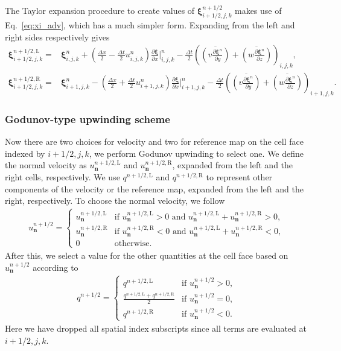 \documentclass[times, 10pt]{article}
\renewcommand{\vec}[1]{\mathbf{#1}}
\newcommand{\p}{\partial}
\newcommand{\nor}{\vec{n}}
\newcommand{\vxi}{\boldsymbol\xi}
\begin{document}
The Taylor expansion procedure to create values of $\vxi^{n+1/2}_{i+1/2, j, k}$ makes use of Eq.~\eqref{eq:xi_adv}, which has a much simpler form. Expanding from the left and right sides respectively gives
\begin{align}
\vxi^{n+1/2,\text{L}}_{i+1/2,j,k} =& \vxi^{n}_{i,j,k} + \left( \frac{\Delta x}{2} - \frac{\Delta t}{2} u^n_{i,j,k} \right) \frac{\p \vxi}{\p x} \bigg |^n_{i,j,k}
- \frac{\Delta t}{2} \left (\overline{\left(v\frac{\p \vxi^n}{\p y}\right)} + \overline{\left(w\frac{\p \vxi^n}{\p z}\right)} \right )_{i,j,k},  \\
%
\vxi^{n+1/2,\text{R}}_{i+1/2,j,k} =& \vxi^{n}_{i+1,j,k} - \left( \frac{\Delta x}{2} + \frac{\Delta t}{2} u^n_{i+1,j,k} \right) \frac{\p \vxi}{\p x} \bigg |^n_{i+1,j,k}
- \frac{\Delta t}{2} \left (\overline{\left(v\frac{\p \vxi^n}{\p y}\right)} + \overline{\left(w\frac{\p \vxi^n}{\p z}\right)} \right )_{i+1,j,k}.
\label{eq:xi_taylor_final}
\end{align}

\subsubsection*{Godunov-type upwinding scheme}
\label{sub:godunov}
Now there are two choices for velocity and two for reference map on the cell face indexed by ${i+1/2,j,k}$, we perform Godunov upwinding to select one.
We define the normal velocity as $u_{\nor}^{n+1/2, \text{L}}$ and $u_{\nor}^{n+1/2, \text{R}}$, expanded from the left and the right cells, respectively.
We use $q^{n+1/2, \text{L}}$ and $q^{n+1/2, \text{R}}$ to represent other components of the velocity or the reference map, expanded from the left and the right, respectively.
To choose the normal velocity, we follow
\begin{align}
u_{\nor}^{n+1/2} =
\begin{cases}
u_{\nor}^{n+1/2, \text{L}} & \text{if~} u_{\nor}^{n+1/2, \text{L}}  > 0 \text{~and~} u_{\nor}^{n+1/2, \text{L}}  + u_{\nor}^{n+1/2, \text{R}}  > 0, \\
u_{\nor}^{n+1/2, \text{R}} & \text{if~} u_{\nor}^{n+1/2, \text{R}} < 0 \text{~and~} u_{\nor}^{n+1/2, \text{L}}  + u_{\nor}^{n+1/2, \text{R}}  < 0, \\
0  & \text{otherwise.}
\end{cases}
\end{align}
After this, we select a value for the other quantities at the cell face based on $u_{\nor}^{n+1/2}$ according to
\begin{align}
q^{n+1/2} =
\begin{cases}
q^{n+1/2, \text{L}} & \text{if~} u_{\nor}^{n+1/2}  > 0, \\
\frac{q^{n+1/2, \text{L}}  + q^{n+1/2, \text{R}} }{2}  & \text{if~} u_{\nor}^{n+1/2} = 0, \\
q^{n+1/2, \text{R}} & \text{if~} u_{\nor}^{n+1/2} < 0.
\end{cases}
\end{align}
Here we have dropped all spatial index subscripts since all terms are evaluated at $i+1/2, j, k$.
\end{document}

